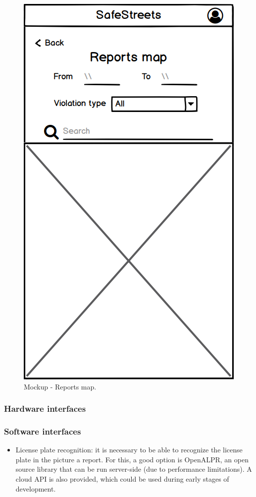 \begin{@empty}
\begin{figure}[H]
\begin{minipage}{.4\textwidth}
    \includegraphics[width=.8\textwidth]{Images/reports-map.png}
    \caption{\label{fig:mockup-reports-map}Mockup - Reports map.}
\end{minipage}
\end{figure}
\end{@empty}

\subsubsection{Hardware interfaces}
\subsubsection{Software interfaces}
\begin{itemize}
\item
License plate recognition: it is necessary to be able to recognize the license plate in the picture a report. For this, a good option is OpenALPR, an open source library that can be run server-side (due to performance limitations). A cloud API is also provided, which could be used during early stages of development.
\end{itemize}
